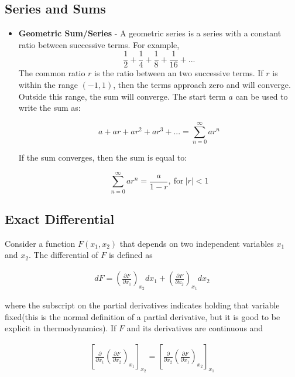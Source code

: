 \documentclass{article}
\numberwithin{theorem}{subsection}
\numberwithin{theorem}{subsubsection}
\numberwithin{lemma}{subsection}
\numberwithin{lemma}{subsubsection}
\theoremstyle{definition}
\numberwithin{definition}{subsection}
\numberwithin{definition}{subsubsection}
\begin{document}
\subsection{Series and Sums}
\begin{itemize}
    \item \textbf{Geometric Sum/Series} - A geometric series is a series with a constant ratio between successive terms. For example,
    \begin{equation}
        \frac{1}{2} + \frac{1}{4} + \frac{1}{8} + \frac{1}{16} + ...
    \end{equation}
    The common ratio $r$ is the ratio between an two successive terms. If $r$ is within the range $(-1,1)$, then the terms approach zero and will converge. Outside this range, the sum will converge. The start term $a$ can be used to write the sum as:
    
    \begin{equation}
        a + ar + ar^2 + ar^3 + ... = \sum_{n=0}^{\infty} ar^n
    \end{equation}
    
    If the sum converges, then the sum is equal to:
    
    \begin{equation}
        \sum_{n=0}^{\infty} ar^n = \frac{a}{1 - r},\ \text{for}\ |r| < 1
    \end{equation}
\end{itemize}

\subsection{Exact Differential}
\indent Consider a function $F(x_{1},x_{2})$ that depends on two independent variables $x_{1}$ and $x_{2}$. The differential of $F$ is defined as

\begin{gather*}
    dF = \left ( \frac{\partial F}{\partial x_{1}} \right )_{x_{2}} dx_{1} + \left ( \frac{\partial F}{\partial x_{2}} \right )_{x_{1}} dx_{2} 
\end{gather*}

\noindent where the subscript on the partial derivatives indicates holding that variable fixed(this is the normal definition of a partial derivative, but it is good to be explicit in thermodynamics). If $F$ and its derivatives are continuous and 

\begin{gather*}
    \left [ \frac{\partial}{\partial x_{1}}\left ( \frac{\partial F}{\partial x_{2}} \right )_{x_{1}}\right ]_{x_{2}} = \left [ \frac{\partial}{\partial x_{2}}\left ( \frac{\partial F}{\partial x_{1}} \right )_{x_{2}}\right ]_{x_{1}}
\end{gather*}
\end{document}
